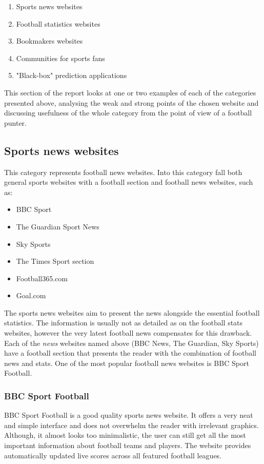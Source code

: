 \begin{enumerate}
	\item Sports news websites
	\item Football statistics websites
	\item Bookmakers websites
	\item Communities for sports fans
	\item "Black-box" prediction applications
\end{enumerate}

This section of the report looks at one or two examples of each of the categories presented above, analysing the weak and strong points of the chosen website and discussing usefulness of the whole category from the point of view of a football punter.
	
\subsection{Sports news websites}
\label{subsec:sportsnewswebsites_req}
This category represents football news websites. Into this category fall both general sports websites with a football section and football news websites, such as:
	
\begin{itemize}
	 \item BBC Sport \citep{source:bbcsport}
	 \item The Guardian Sport News \citep{source:guardiansport}
	 \item Sky Sports \citep{source:skysports}
	 \item The Times Sport section \citep{source:thetimes}
	 \item Football365.com \citep{source:football365}
	 \item Goal.com \citep{source:goal}
\end{itemize}

The sports news websites aim to present the news alongside the essential football statistics. The information is usually not as detailed as on the football stats websites, however the very latest football news compensates for this drawback. Each of the \emph{news} websites named above (BBC News, The Guardian, Sky Sports) have a football section that presents the reader with the combination of football news and stats.  One of the most popular football news websites is BBC Sport Football.
	
\subsubsection{BBC Sport Football}
\label{subsubsec:bbcsportfootball_req}
BBC Sport Football is a good quality sports news website. It offers a very neat and simple interface and does not overwhelm the reader with irrelevant graphics. Although, it almost looks too minimalistic, the user can still get all the most important information about football teams and players. The website provides automatically updated live scores across all featured football leagues.


